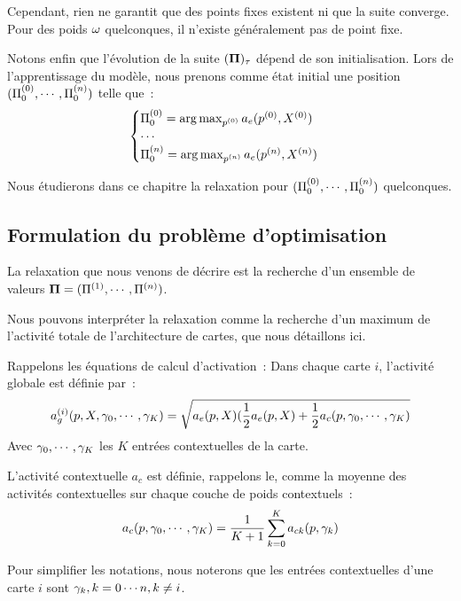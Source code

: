 \documentclass[../main]{subfiles}
\begin{document}
Cependant, rien ne garantit que des points fixes existent ni que la suite converge.
Pour des poids $\omega$ quelconques, il n'existe généralement pas de point fixe.

Notons enfin que l'évolution de la suite $(\mathbf{\Pi})_{\tau}$ dépend de son initialisation.
Lors de l'apprentissage du modèle, nous prenons comme état initial une position $(\Pi^{({0})}_0, \cdots , \Pi^{({n})}_0)$  telle que~: 
\begin{equation}
\begin{cases}
\Pi^{({0})}_0 = \operatorname*{arg\,max}_{p^{({0})}} a_e(p^{({0})},X^{({0})})\\
\cdots \\
\Pi^{({n})}_0 = \operatorname*{arg\,max}_{p^{({n})}} a_e(p^{({n})},X^{({n})})\\
\end{cases}
\label{eq:init}
\end{equation}

Nous étudierons dans ce chapitre la relaxation pour $(\Pi^{({0})}_0, \cdots , \Pi^{({n})}_0)$ quelconques.

\subsection{Formulation du problème d'optimisation}

La relaxation que nous venons de décrire est la recherche d'un ensemble de valeurs $\mathbf{\Pi} = (\Pi^{({1})}, \cdots, \Pi^{({n})})$.

Nous pouvons interpréter la relaxation comme la recherche d'un maximum de l'activité totale de l'architecture de cartes, que nous détaillons ici. 

Rappelons les équations de calcul d'activation~:
Dans chaque carte $i$, l'activité globale est définie par~:
\begin{equation}\label{eq:ag}
	a_g^{({i})}(p, X, \gamma_0, \cdots, \gamma_K) = \sqrt{a_e(p,X)(\frac{1}{2}a_e(p,X) + \frac{1}{2}a_c(p,\gamma_0, \cdots, \gamma_K)}
\end{equation}
Avec $\gamma_0, \cdots, \gamma_K$ les $K$ entrées contextuelles de la carte. 

L'activité contextuelle $a_c$ est définie, rappelons le, comme la moyenne des activités contextuelles sur chaque couche de poids contextuels~:
\begin{equation}
	a_c(p, \gamma_0, \cdots, \gamma_K) = \frac{1}{K+1}\sum_{k=0}^{K}{a_{ck}(p, \gamma_k)}
\end{equation}

Pour simplifier les notations, nous noterons que les entrées contextuelles d'une carte $i$ sont ${\gamma_k, k = 0 \cdots n , k \neq i}$.
\end{document}
